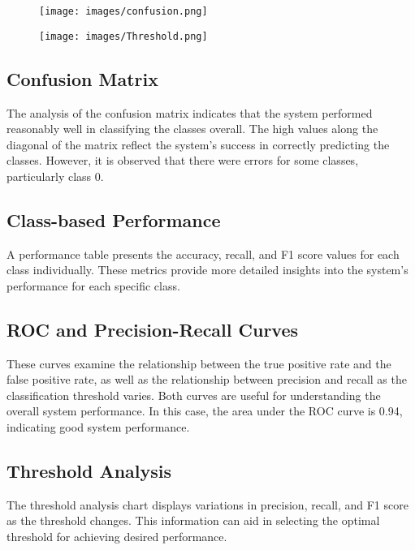 \documentclass[12pt]{article}
\begin{document}
\begin{figure}[ht]
    \centering
    \begin{minipage}{0.45\textwidth}
        \centering
        \texttt{[image: images/confusion.png]}
    \end{minipage}
    \hfill
    \begin{minipage}{0.45\textwidth}
        \centering
        \texttt{[image: images/Threshold.png]}
    \end{minipage}
\end{figure}

\subsection{Confusion Matrix}
The analysis of the confusion matrix indicates that the system performed reasonably well in classifying the classes overall. The high values along the diagonal of the matrix reflect the system's success in correctly predicting the classes. However, it is observed that there were errors for some classes, particularly class 0.

\subsection{Class-based Performance}
A performance table presents the accuracy, recall, and F1 score values for each class individually. These metrics provide more detailed insights into the system's performance for each specific class.

\subsection{ROC and Precision-Recall Curves}
These curves examine the relationship between the true positive rate and the false positive rate, as well as the relationship between precision and recall as the classification threshold varies. Both curves are useful for understanding the overall system performance. In this case, the area under the ROC curve is 0.94, indicating good system performance.

\subsection{Threshold Analysis}
The threshold analysis chart displays variations in precision, recall, and F1 score as the threshold changes. This information can aid in selecting the optimal threshold for achieving desired performance.
\end{document}

